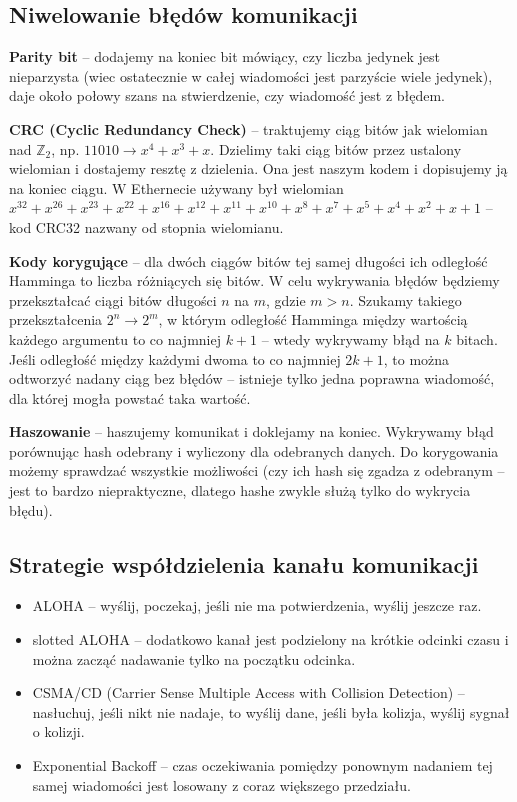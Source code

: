 \subsection{Niwelowanie błędów komunikacji}
\textbf{Parity bit} -- dodajemy na koniec bit mówiący, czy liczba jedynek jest nieparzysta (wiec ostatecznie w całej wiadomości jest parzyście wiele jedynek), daje około połowy szans na stwierdzenie, czy wiadomość jest z błędem.

\textbf{CRC (Cyclic Redundancy Check)} -- traktujemy ciąg bitów jak wielomian nad \(\mathbb{Z}_2\), np. \(11010 \rightarrow x^4 + x^3 + x\). Dzielimy taki ciąg bitów przez ustalony wielomian i dostajemy resztę z dzielenia. Ona jest naszym kodem i dopisujemy ją na koniec ciągu. W Ethernecie używany był wielomian \(x^{32}+x^{26}+x^{23}+x^{22}+x^{16}+x^{12}+x^{11}+x^{10}+x^{8}+x^{7}+x^{5}+x^{4}+x^{2}+x+1\) -- kod CRC32 nazwany od stopnia wielomianu.

\textbf{Kody korygujące} -- dla dwóch ciągów bitów tej samej długości ich odległość Hamminga to liczba różniących się bitów. W celu wykrywania błędów będziemy przekształcać ciągi bitów długości \(n\) na \(m\), gdzie \(m > n\). Szukamy takiego przekształcenia \(2^n \to 2^m\), w którym odległość Hamminga między wartością każdego argumentu to co najmniej \(k+1\) -- wtedy wykrywamy błąd na \(k\) bitach. Jeśli odległość między każdymi dwoma to co najmniej \(2k+1\), to można odtworzyć nadany ciąg bez błędów -- istnieje tylko jedna poprawna wiadomość, dla której mogła powstać taka wartość.

\textbf{Haszowanie} -- haszujemy komunikat i doklejamy na koniec. Wykrywamy błąd porównując hash odebrany i wyliczony dla odebranych danych. Do korygowania możemy sprawdzać wszystkie możliwości (czy ich hash się zgadza z odebranym -- jest to bardzo niepraktyczne, dlatego hashe zwykle służą tylko do wykrycia błędu).

\subsection{Strategie współdzielenia kanału komunikacji}
\begin{itemize}
	\item ALOHA -- wyślij, poczekaj, jeśli nie ma potwierdzenia, wyślij jeszcze raz.
	\item slotted ALOHA -- dodatkowo kanał jest podzielony na krótkie odcinki czasu i można zacząć nadawanie tylko na początku odcinka.
	\item CSMA/CD (Carrier Sense Multiple Access with Collision Detection) -- nasłuchuj, jeśli nikt nie nadaje, to wyślij dane, jeśli była kolizja, wyślij sygnał o kolizji.
	\item Exponential Backoff -- czas oczekiwania pomiędzy ponownym nadaniem tej samej wiadomości jest losowany z coraz większego przedziału.
\end{itemize}
